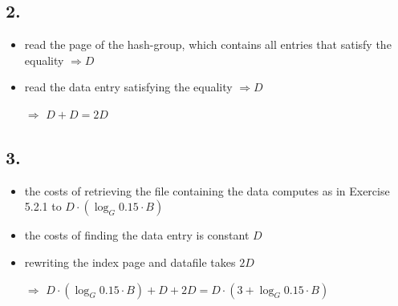 \documentclass[12pt]{article}
\begin{document}
	\subsection*{2.}
		\begin{itemize}
			\item read the page of the hash-group, which contains all entries that satisfy the equality $\Rightarrow D$
			\item read the data entry satisfying the equality $\Rightarrow D$
			\item[$\Rightarrow$] $D+D=2D$
		\end{itemize}
	\subsection*{3.}
		\begin{itemize}
			\item the costs of retrieving the file containing the data computes as in Exercise 5.2.1 to $D\cdot (\log_G 0.15\cdot B)$
			\item the costs of finding the data entry is constant $D$
			\item rewriting the index page and datafile takes $2D$
			\item[$\Rightarrow$] $D\cdot (\log_G 0.15\cdot B) + D + 2D = D\cdot (3+\log_G 0.15\cdot B)$
		\end{itemize}
	
\end{document}

